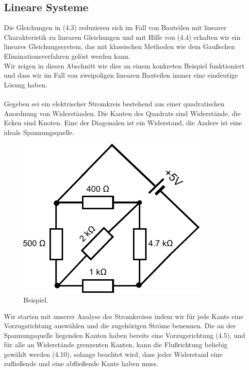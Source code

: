 \documentclass[11pt,a4paper,leqno]{report}
\numberwithin{equation}{chapter}
\begin{document}
\subsection{Lineare Systeme}
Die Gleichungen in (4.3) reduzieren sich im Fall von Bauteilen mit linearer Charakteristik zu linearen Gleichungen und mit Hilfe von (4.4) erhalten wir ein lineares Gleichungssystem, das mit klassischen Methoden wie dem Gau\ss{}schen Eliminationsverfahren gel\"ost werden kann. \\Wir zeigen in diesen Abschnitt wie dies an einem konkreten Beispiel funktioniert und dass wir im Fall von zweipoligen linearen Bauteilen immer eine eindeutige L\"osung haben.\\
\\
Gegeben sei ein elektrischer Stromkreis bestehend aus einer quadratischen Anordnung von Widerst\"anden. Die Kanten des Quadrats sind Widerst\"ande, die Ecken sind Knoten. Eine der Diagonalen ist ein Widerstand, die Andere ist eine ideale Spannungsquelle.
\begin{figure}[H]
	\begin{center}
		\includegraphics[scale=0.8]{Bilder/stromkreis_1.pdf}
		\caption{Beispiel.}
	\end{center}
\end{figure}
\noindent
Wir starten mit unserer Analyse des Stromkreises indem wir f\"ur jede Kante eine Vorzugsrichtung ausw\"ahlen und die zugeh\"origen Str\"ome benennen. Die an der Spannungsquelle liegenden Kanten haben bereits eine Vorzugsrichtung (4.5), und f\"ur alle an Widerst\"ande grenzenten Kanten, kann die Flu\ss{}richtung beliebig gew\"ahlt werden (4.10), solange beachtet wird, dass jeder Widerstand eine zuflie\ss{}ende und eine abflie\ss{}ende Kante haben muss.
\end{document}
